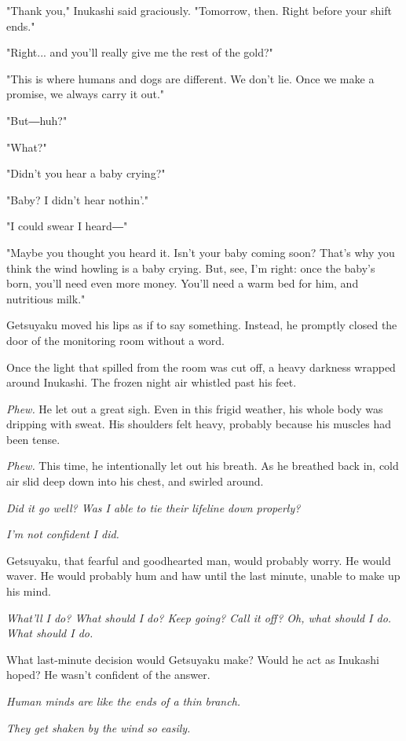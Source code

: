 "Thank you," Inukashi said graciously. "Tomorrow, then. Right before
your shift ends."

"Right... and you'll really give me the rest of the gold?"

"This is where humans and dogs are different. We don't lie. Once we make
a promise, we always carry it out."

"But―huh?"

"What?"

"Didn't you hear a baby crying?"

"Baby? I didn't hear nothin'."

"I could swear I heard―"

"Maybe you thought you heard it. Isn't your baby coming soon? That's why
you think the wind howling is a baby crying. But, see, I'm right: once
the baby's born, you'll need even more money. You'll need a warm bed for
him, and nutritious milk."

Getsuyaku moved his lips as if to say something. Instead, he promptly
closed the door of the monitoring room without a word.

Once the light that spilled from the room was cut off, a heavy darkness
wrapped around Inukashi. The frozen night air whistled past his feet.

\emph{Phew.} He let out a great sigh. Even in this frigid weather, his whole
body was dripping with sweat. His shoulders felt heavy, probably because
his muscles had been tense.

\emph{Phew.} This time, he intentionally let out his breath. As he breathed
back in, cold air slid deep down into his chest, and swirled around.

\emph{Did it go well? Was I able to tie their lifeline down properly?}

\emph{I'm not confident I did.}

Getsuyaku, that fearful and goodhearted man, would probably worry. He
would waver. He would probably hum and haw until the last minute, unable
to make up his mind.

\emph{What'll I do? What should I do? Keep going? Call it off? Oh, what should
I do. What should I do.}

What last-minute decision would Getsuyaku make? Would he act as Inukashi
hoped? He wasn't confident of the answer.

\emph{Human minds are like the ends of a thin branch.}

\emph{They get shaken by the wind so easily.}


